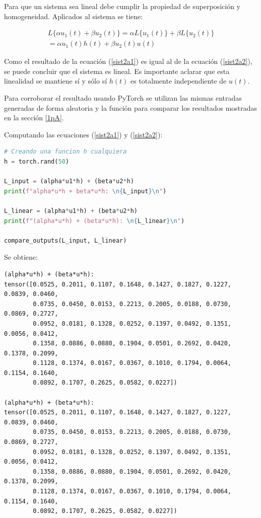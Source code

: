\documentclass[12 pt]{article}
\begin{document}
\begin{enumerate}
Para que un sistema sea lineal debe cumplir la propiedad de superposición y homogeneidad. Aplicados al sistema se tiene:

\begin{center}
\begin{equation} \label{sist2a2}
\begin{split}
 L\{ \alpha u_{1}(t) + \beta u_{2}(t) \} = \alpha L\{ u_{1}(t) \} + \beta L\{ u_{2}(t) \} \\
 = \alpha u_{1}(t)h(t) + \beta u_{2}(t)u(t)
\end{split}
\end{equation}
\end{center}

Como el resultado de la ecuación (\ref{sist2a1}) es igual al de la ecuación (\ref{sist2a2}), se puede concluir que el sistema es lineal. Es importante aclarar que esta linealidad se mantiene sí y sólo sí ${h(t)}$ es totalmente independiente de ${u(t)}$.

Para corroborar el resultado usando PyTorch se utilizan las mismas entradas generadas de forma aleatoria y la función para comparar los resultados mostradas en la sección \ref{1pA}.

Computando las ecuaciones (\ref{sist2a1}) y (\ref{sist2a2}):

\begin{lstlisting}[language=Python]
# Creando una funcion h cualquiera
h = torch.rand(50)

L_input = (alpha*u1*h) + (beta*u2*h)
print(f"alpha*u*h + beta*u*h: \n{L_input}\n")

L_linear = (alpha*u1*h) + (beta*u2*h)
print(f"(alpha*u*h) + (beta*u*h): \n{L_linear}\n")

compare_outputs(L_input, L_linear)
\end{lstlisting}

Se obtiene:

\begin{lstlisting}
(alpha*u*h) + (beta*u*h): 
tensor([0.0525, 0.2011, 0.1107, 0.1648, 0.1427, 0.1827, 0.1227, 0.0839, 0.0460,
        0.0735, 0.0450, 0.0153, 0.2213, 0.2005, 0.0188, 0.0730, 0.0869, 0.2727,
        0.0952, 0.0181, 0.1328, 0.0252, 0.1397, 0.0492, 0.1351, 0.0056, 0.0412,
        0.1358, 0.0886, 0.0880, 0.1904, 0.0501, 0.2692, 0.0420, 0.1378, 0.2099,
        0.1128, 0.1374, 0.0167, 0.0367, 0.1010, 0.1794, 0.0064, 0.1154, 0.1640,
        0.0892, 0.1707, 0.2625, 0.0582, 0.0227])

(alpha*u*h) + (beta*u*h): 
tensor([0.0525, 0.2011, 0.1107, 0.1648, 0.1427, 0.1827, 0.1227, 0.0839, 0.0460,
        0.0735, 0.0450, 0.0153, 0.2213, 0.2005, 0.0188, 0.0730, 0.0869, 0.2727,
        0.0952, 0.0181, 0.1328, 0.0252, 0.1397, 0.0492, 0.1351, 0.0056, 0.0412,
        0.1358, 0.0886, 0.0880, 0.1904, 0.0501, 0.2692, 0.0420, 0.1378, 0.2099,
        0.1128, 0.1374, 0.0167, 0.0367, 0.1010, 0.1794, 0.0064, 0.1154, 0.1640,
        0.0892, 0.1707, 0.2625, 0.0582, 0.0227])


\end{lstlisting}
\end{enumerate}
\end{document}
